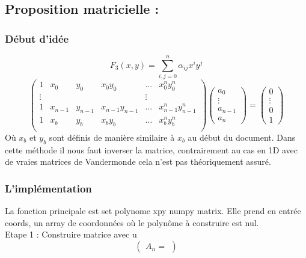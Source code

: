 \documentclass{article}
\begin{document}
\subsection{Proposition matricielle :}
\subsubsection*{Début d'idée}
\begin{equation*}
    F_3(x,y) = \sum_{i,j = 0}^{n} \alpha_{ij}x^iy^j
\end{equation*}
\begin{equation*}
    \begin{pmatrix}
    1 & x_0 & y_0 & x_0y_0 & \dots & x_{0}^{n}y_{0}^{n} \\
    \vdots & & & & \vdots \\
    1 & x_{n-1} & y_{n-1} & x_{n-1}y_{n-1} & \dots & x_{n-1}^{n}y_{n-1}^{n} \\
    1 & x_{b} & y_{b} & x_{b}y_{b} & \dots & x_{b}^{n}y_{b}^{n} \\
    \end{pmatrix}
    \begin{pmatrix}
    a_0\\
    \vdots\\
    a_{n-1}\\
    a_{n}
    \end{pmatrix}
    =
    \begin{pmatrix}
    0\\
    \vdots\\
    0\\
    1
    \end{pmatrix}
\end{equation*}
Où $x_b$ et $y_b$ sont définis de manière similaire à $x_b$ au début du document. Dans cette méthode il nous faut inverser la matrice, contrairement au cas en 1D avec de vraies matrices de Vandermonde cela n'est pas théoriquement assuré.

\subsubsection*{L'implémentation}
La fonction principale est set polynome xpy numpy matrix.
Elle prend en entrée coords, un array de coordonnées où le polynôme à construire est nul.\\

Etape 1 : Construire matrice avec u
\begin{equation}
    \begin{pmatrix}
    A_{n} = 
\end{pmatrix}
\end{equation}
\end{document}
